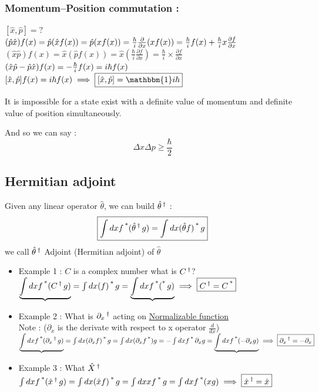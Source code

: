 \documentclass[12pt,oneside]{book}
\begin{document}
\subsubsection{Momentum--Position commutation :}
$[\hat{x},\hat{p}] = ?$ \\
$ (\hat{p}\hat{x})f(x) = \hat{p}(\hat{x}f(x))= \hat{p}(xf(x)) = \frac{\hbar}{i}\frac{\partial}{\partial x}(xf(x)) = \frac{\hbar}{i}f(x) + \frac{\hbar}{i}x\frac{\partial f}{\partial x}\\$
$(\hat{x}\hat{p})f(x) = \hat{x}(\hat{p}f(x)) = \hat{x}(\frac{\hbar}{i}\frac{\partial f}{\partial x}) = \frac{\hbar}{i}\times \frac{\partial f}{\partial x}$\\
$(\hat{x}\hat{p}-\hat{p}\hat{x})f(x) = - \frac{\hbar}{i}f(x) = i\hbar f(x) \\$
$[\hat{x},\hat{p}]f(x) = i\hbar f(x) \implies \boxed{[\hat{x},\hat{p}] = \mathbbm{1}i\hbar}$\\
\begin{center}
	It is impossible for a state exist with a definite value of momentum and definite value of position simultaneously.
\end{center}
And so we can say : 
\[\boxed{\Delta x\Delta p \geq \frac{\hbar}{2}}\]

\subsection{Hermitian adjoint}
Given any linear operator $\hat{\theta}$, we can build $\hat{\theta}\operatorname{^\dagger}$ : \\
\[\boxed{\int dxf\operatorname{^*}(\hat{\theta}\operatorname{^\dagger} g) = \int dx(\hat{\theta}f)\operatorname{^*} g}\]
we call $\hat{\theta}\operatorname{^\dagger}$ Adjoint (Hermitian adjoint) of $\hat{\theta}$
\begin{itemize}
	\item Example 1 : $C$ is a complex number what is $C\operatorname{^\dagger}$? \\
	      $ \underbrace{\int dx f\operatorname{^*}(C\operatorname{^\dagger} g) } = \int dx( f)\operatorname{^*} g  = \underbrace{\int dx f\operatorname{^*} (\operatorname{^*} g)} \implies \boxed{C\operatorname{^\dagger} = C\operatorname{^*}} $
	\item Example 2 : What is $\partial_x\operatorname{^\dagger}$ acting on \underline{Normalizable function} \\
	      Note : ($\partial_x$ is the derivate with respect to x operator $\frac{d}{dx}$)\\
	      $\underbrace{\int dx f\operatorname{^*}(\partial_x\operatorname{^\dagger} g)} = \int dx (\partial_x f)\operatorname{^*} g= \int dx (\partial_x f\operatorname{^*})g = -\int dx f\operatorname{^*} \partial_x g = \underbrace{\int dx f\operatorname{^*}(-\partial_x g)} \implies \boxed{\partial_x\operatorname{^\dagger} = - \partial_x}$
	\item Example 3 : What $\hat{X}\operatorname{^\dagger}$ \\
	      $\int dx f\operatorname{^*}(\hat{x}\operatorname{^\dagger} g) = \int dx (\hat{x}f)\operatorname{^*} g = \int dx x f\operatorname{^*} g = \int dx f\operatorname{^*} (xg) \implies \boxed{\hat{x}\operatorname{^\dagger} = \hat{x}} $
\end{itemize}
\end{document}
